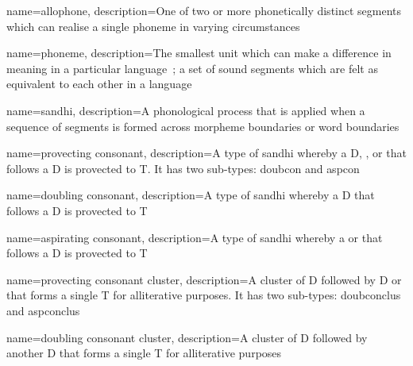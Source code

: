 \usepackage[%
            xindy,
            toc,
            ]{glossaries}
\usepackage{glossary-mcols}

\makeglossaries
\usepackage[xindy]{imakeidx}
\makeindex


%
{
  name=allophone,
  description={One of two or more phonetically distinct segments which can realise a single phoneme in varying circumstances~\autocite[s.v.~\emph{allophone}]{Tra_dictionary96}}
}

%
{
  name=phoneme,
  description={The smallest unit which can make a difference in meaning in a particular language~\autocite[s.v.~\emph{phoneme}]{Tra_dictionary96}; a set of sound segments which are felt as equivalent to each other in a language}
}

%
{
  name=sandhi,
  description={A phonological process that is applied when a sequence of segments is formed across morpheme boundaries or word boundaries~\autocite[s.v.~\emph{sandhi}]{Tra_dictionary96}}
}

{
    name=provecting consonant,
    description={A type of \gls{sandhi} whereby a \gls{D}, , or  that follows a \gls{D} is provected to \gls{T}. It has two sub-types: \gls{doubcon} and \gls{aspcon}}
}

{
    name=doubling consonant,
    description={A type of \gls{sandhi} whereby a \gls{D} that follows a \gls{D} is provected to \gls{T}}
}

{
    name=aspirating consonant,
    description={A type of \gls{sandhi} whereby a  or  that follows a \gls{D} is provected to \gls{T}}
}

{
    name=provecting consonant cluster,
    description={A cluster of \gls{D} followed by \gls{D} or  that forms a single \gls{T} for alliterative purposes. It has two sub-types: \gls{doubconclus} and \gls{aspconclus}}
}

{
    name=doubling consonant cluster,
    description={A cluster of \gls{D} followed by another \gls{D} that forms a single \gls{T} for alliterative purposes}
}

